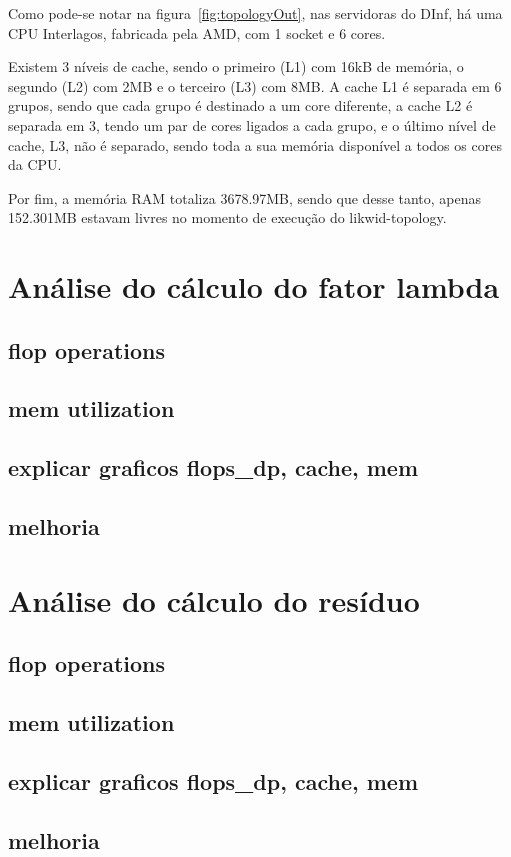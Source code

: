 \documentclass[12pt]{article}
\begin{document}
Como pode-se notar na figura~\ref{fig:topologyOut}, nas servidoras do DInf, há uma CPU Interlagos, fabricada pela AMD, com 1 socket e 6 cores.

Existem 3 níveis de cache, sendo o primeiro (L1) com 16kB de memória, o segundo (L2) com 2MB e o terceiro (L3) com 8MB. A cache L1 é separada em 6 grupos, sendo que cada grupo é destinado a um core diferente, a cache L2 é separada em 3, tendo um par de cores ligados a cada grupo, e o último nível de cache, L3, não é separado, sendo toda a sua memória disponível a todos os cores da CPU.

Por fim, a memória RAM totaliza 3678.97MB, sendo que desse tanto, apenas 152.301MB estavam livres no momento de execução do likwid-topology.

\section{Análise do cálculo do fator lambda}\label{sec:lambda}
\subsection{flop operations}
\subsection{mem utilization}
\subsection{explicar graficos flops\_dp, cache, mem}
\subsection{melhoria}

\section{Análise do cálculo do resíduo}\label{sec:residuo}
\subsection{flop operations}
\subsection{mem utilization}
\subsection{explicar graficos flops\_dp, cache, mem}
\subsection{melhoria}
\end{document}
